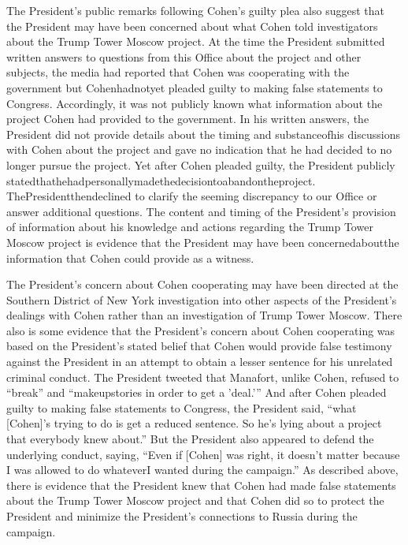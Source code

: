 {The President's public remarks following Cohen's guilty plea also suggest that the President may have been concerned about what Cohen told investigators about the Trump Tower Moscow project.
At the time the President submitted written answers to questions from this Office about the project and other subjects, the media had reported that Cohen was cooperating with the government but Cohenhadnotyet pleaded guilty to making false statements to Congress.
Accordingly, it was not publicly known what information about the project Cohen had provided to the government.
In his written answers, the President did not provide details about the timing and substanceofhis discussions with Cohen about the project and gave no indication that he had decided to no longer pursue the project.
Yet after Cohen pleaded guilty, the President publicly statedthathehadpersonallymadethedecisiontoabandontheproject.
ThePresidentthendeclined to clarify the seeming discrepancy to our Office or answer additional questions.
The content and timing of the President's provision of information about his knowledge and actions regarding the Trump Tower Moscow project is evidence that the President may have been concernedaboutthe information that Cohen could provide as a witness.

The President's concern about Cohen cooperating may have been directed at the Southern District of New York investigation into other aspects of the President's dealings with Cohen rather than an investigation of Trump Tower Moscow.
There also is some evidence that the President's concern about Cohen cooperating was based on the President's stated belief that Cohen would provide false testimony against the President in an attempt to obtain a lesser sentence for his unrelated criminal conduct.
The President tweeted that Manafort, unlike Cohen, refused to “break” and “makeupstories in order to get a 'deal.'” And after Cohen pleaded guilty to making false statements to Congress, the President said, “what [Cohen]'s trying to do is get a reduced sentence.
So he's lying about a project that everybody knew about.” But the President also appeared to defend the underlying conduct, saying, “Even if [Cohen] was right, it doesn't matter because I was allowed to do whateverI wanted during the campaign.”
As described above, there is evidence that the President knew that Cohen had made false statements about the Trump Tower Moscow project and that Cohen did so to protect the President and minimize the President's connections to Russia during the campaign.

}
